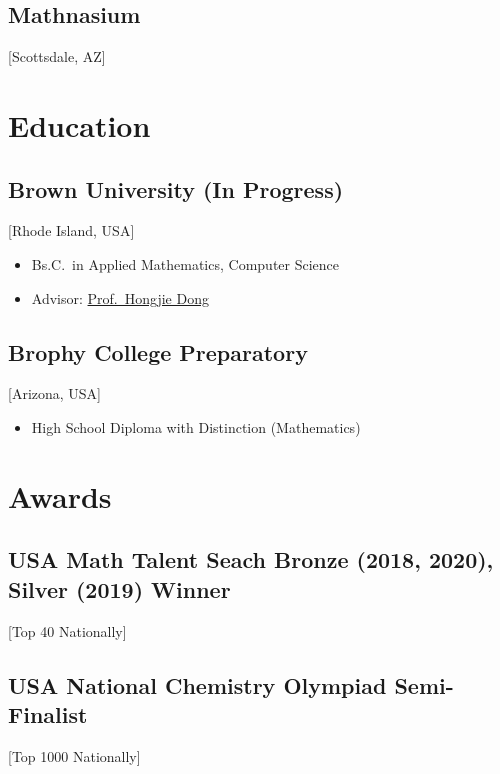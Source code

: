 \documentclass{mycv}
\begin{document}
\subsection{Mathnasium}[Scottsdale, AZ]
\begin{positions}
\end{positions}

\section{Education}

\subsection{Brown University (In Progress)}[Rhode Island, USA]
\vspace{-\parskip}%
\begin{itemize}[label={}]
  \item Bs.C.\ in Applied Mathematics, Computer Science 
  \item Advisor: \href{https://www.dam.brown.edu/people/hdong/}{Prof.~Hongjie Dong}
\end{itemize}

\subsection{Brophy College Preparatory}[Arizona, USA]
\vspace{-\parskip}%
\begin{itemize}[label={}]
  \item High School Diploma with Distinction (Mathematics) 
\end{itemize}

\section{Awards}
\subsection{USA Math Talent Seach Bronze (2018, 2020), Silver (2019) Winner}[Top 40 Nationally]

\subsection{USA National Chemistry Olympiad Semi-Finalist}[Top 1000 Nationally]
\end{document}
